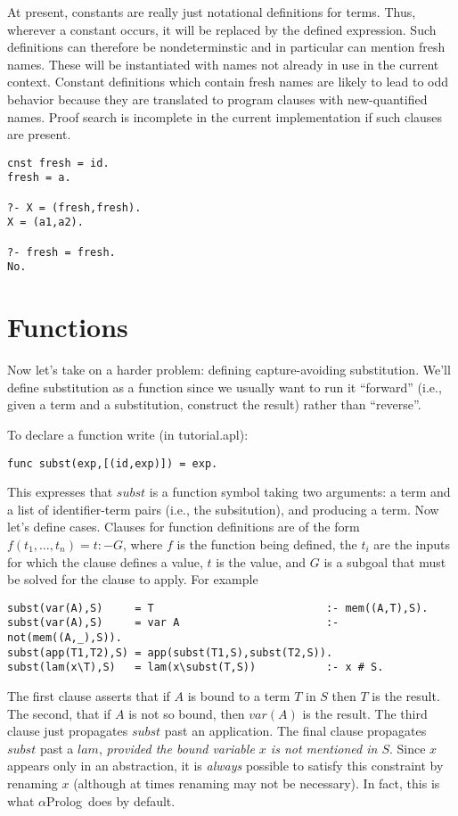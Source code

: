 \documentclass[draft,12pt]{report}
\newcommand{\aprolog}{$\alpha${Prolog}\xspace}
\begin{document}
At present, constants are really just notational definitions for
terms.  Thus, wherever a constant occurs, it will be replaced by the 
defined expression.  Such definitions can therefore be nondeterminstic 
and in particular can mention fresh names.  These will be instantiated
with names not already in use in the current context.  Constant definitions
which contain fresh names are likely to lead to odd behavior because 
they are translated to program clauses with new-quantified names.  Proof
search is incomplete in the current implementation if such clauses are 
present.
\begin{verbatim}
cnst fresh = id.
fresh = a.

?- X = (fresh,fresh).
X = (a1,a2).

?- fresh = fresh.
No.
\end{verbatim}


\section{Functions}

Now let's take on a harder problem: defining capture-avoiding
substitution.  We'll define substitution as a function since we
usually want to run it ``forward'' (i.e., given a term and a
substitution, construct the result) rather than ``reverse''.

To declare a function write (in tutorial.apl):
\begin{verbatim}
func subst(exp,[(id,exp)]) = exp.
\end{verbatim}
This expresses that $subst$ is a function symbol taking two arguments:
a term and a list of identifier-term pairs (i.e., the subsitution),
and producing a term.  Now let's define cases.  Clauses for function
definitions are of the form $f(t_1,\ldots,t_n) = t \mathrel{:-} G$,
where $f$ is the function being defined, the $t_i$ are the inputs for
which the clause defines a value, $t$ is the value, and $G$ is a
subgoal that must be solved for the clause to apply.  For example
\begin{verbatim}
subst(var(A),S)     = T                           :- mem((A,T),S).
subst(var(A),S)     = var A                       :- not(mem((A,_),S)).
subst(app(T1,T2),S) = app(subst(T1,S),subst(T2,S)).
subst(lam(x\T),S)   = lam(x\subst(T,S))           :- x # S.
\end{verbatim}
The first clause asserts that if $A$ is bound to a term $T$ in $S$
then $T$ is the result.  The second, that if $A$ is not so bound, then
$var(A)$ is the result.  The third clause just propagates $subst$ past
an application.  The final clause propagates $subst$ past a $lam$,
\emph{provided the bound variable $x$ is not mentioned in $S$}.  Since
$x$ appears only in an abstraction, it is \emph{always} possible to
satisfy this constraint by renaming $x$ (although at times renaming
may not be necessary).  In fact, this is what \aprolog\ does by
default.
\end{document}
